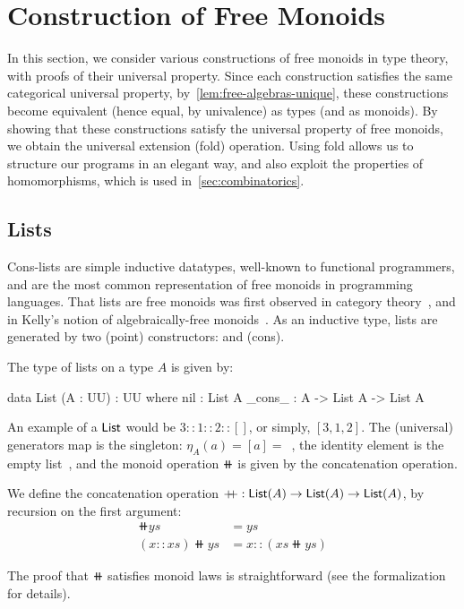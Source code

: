 \section{Construction of Free Monoids}
\label{sec:monoids}

In this section, we consider various constructions of free monoids in type theory, with proofs of their universal
property.
%
Since each construction satisfies the same categorical universal property, by~\cref{lem:free-algebras-unique},
these constructions become equivalent (hence equal, by univalence) as types (and as monoids).
%
By showing that these constructions satisfy the universal property of free monoids, we obtain the universal extension
(fold) operation.
%
Using fold allows us to structure our programs in an elegant way, and also exploit the properties of homomorphisms,
which is used in~\cref{sec:combinatorics}.

\subsection{Lists}
\label{mon:lists}

Cons-lists are simple inductive datatypes, well-known to functional programmers,
and are the most common representation of free monoids in programming languages.
%
That lists are free monoids was first observed in category theory~\cite{dubucFreeMonoids1974}, and in Kelly's notion of
algebraically-free monoids~\cite{kellyUnifiedTreatmentTransfinite1980}.
%
As an inductive type, lists are generated by two (point) constructors:  and  (cons).
\begin{definition}[Lists]
    \label{def:lists}
    The type of lists on a type $A$ is given by:
    \begin{code}
data List (A : UU) : UU where
  nil : List A
  _cons_ : A -> List A -> List A
\end{code}
\end{definition}

An example of a $\operatorname{\mathsf{List}}$ would be $3 :: 1 :: 2 :: []$, or simply, $[3, 1, 2]$.
%
The (universal) generators map is the singleton: $\eta_A(a) = [a] =$~,
the identity element is the empty list~,
and the monoid operation $\doubleplus$ is given by the concatenation operation.

\begin{definition}[Concatenation]
    We define the concatenation operation $\mathbin{+\kern -0.4em+} : \operatorname{\mathsf{List}}(A) \to \operatorname{\mathsf{List}}(A) \to \operatorname{\mathsf{List}}(A)$,
    by recursion on the first argument:
    \begin{align*}
        [] \doubleplus ys        & = ys                       \\
        (x :: xs) \doubleplus ys & = x :: (xs \doubleplus ys)
    \end{align*}
\end{definition}
The proof that $\doubleplus$ satisfies monoid laws is straightforward (see the formalization for details).

